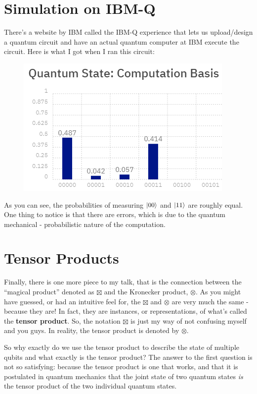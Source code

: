\documentclass[a4paper,11pt]{article}
\numberwithin{equation}{section}
\theoremstyle{definition}
\begin{document}
\section{Simulation on IBM-Q}

There's a website by IBM called the IBM-Q experience that lets us upload/design a quantum circuit and have an actual quantum computer at IBM execute the circuit. Here is what I got when I ran this circuit:
	\begin{figure}[h!]
	\centering
	\includegraphics[scale=0.8]{ibmq1.png}
\end{figure}
As you can see, the probabilities of measuring $\left\vert{00}\right\rangle$ and $\left\vert{11}\right\rangle$ are roughly equal. One thing to notice is that there are errors, which is due to the quantum mechanical - probabilistic nature of the computation. 




\section{Tensor Products}

Finally, there is one more piece to my talk, that is the connection between the ``magical product'' denoted as $\boxtimes$ and the Kronecker product, $\otimes$. As you might have guessed, or had an intuitive feel for, the $\boxtimes$ and $\otimes$ are very much the same - because they are! In fact, they are instances, or representations, of what's called the \textbf{tensor product}. So, the notation $\boxtimes$ is just my way of not confusing myself and you guys. In reality, the tensor product is denoted by $\otimes$. 

So why exactly do we use the tensor product to describe the state of multiple qubits and what exactly is the tensor product? The answer to the first question is not so satisfying: because the tensor product is one that works, and that it is postulated in quantum mechanics that the joint state of two quantum states \textit{is} the tensor product of the two individual quantum states. 
\end{document}
